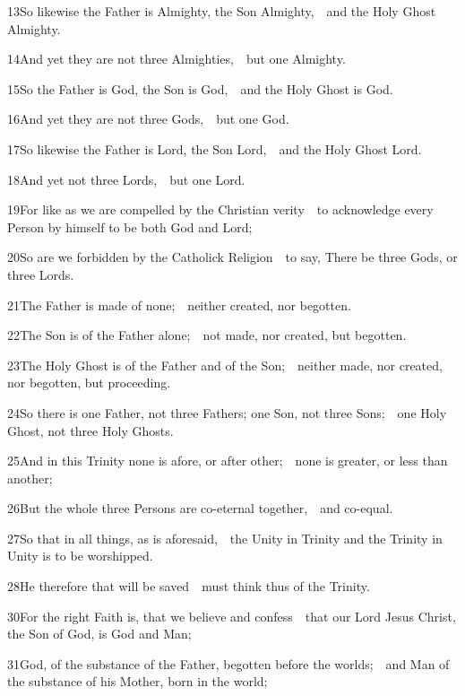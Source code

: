 13\enspace So likewise the Father is Almighty, the Son Almighty,\ \star\ and the Holy Ghost Almighty.

14\enspace And yet they are not three Almighties,\ \star\ but one Almighty.

15\enspace So the Father is God, the Son is God,\ \star\ and the Holy Ghost is God.

16\enspace And yet they are not three Gods,\ \star\ but one God.

17\enspace So likewise the Father is Lord, the Son Lord,\ \star\ and the Holy Ghost Lord.

18\enspace And yet not three Lords,\ \star\ but one Lord.

19\enspace For like as we are compelled by the Christian verity\ \star\ to acknowledge every Person by himself to be both God and Lord;

20\enspace So are we forbidden by the Catholick Religion\ \star\ to say, There be three Gods, or three Lords.

21\enspace The Father is made of none;\ \star\ neither created, nor begotten.

22\enspace The Son is of the Father alone;\ \star\ not made, nor created, but begotten.

23\enspace The Holy Ghost is of the Father and of the Son;\ \star\ neither made, nor created, nor begotten, but proceeding.

24\enspace So there is one Father, not three Fathers; one Son, not three Sons;\ \star\ one Holy Ghost, not three Holy Ghosts.

25\enspace And in this Trinity none is afore, or after other;\ \star\ none is greater, or less than another;

26\enspace But the whole three Persons are co-eternal together,\ \star\ and co-equal.

27\enspace So that in all things, as is aforesaid,\ \star\ the Unity in Trinity and the Trinity in Unity is to be worshipped.

28\enspace He therefore that will be saved\ \star\ must think thus of the Trinity.


30\enspace For the right Faith is, that we believe and confess\ \star\ that our Lord Jesus Christ, the Son of God, is God and Man;

31\enspace God, of the substance of the Father, begotten before the worlds;\ \star\ and Man of the substance of his Mother, born in the world;

